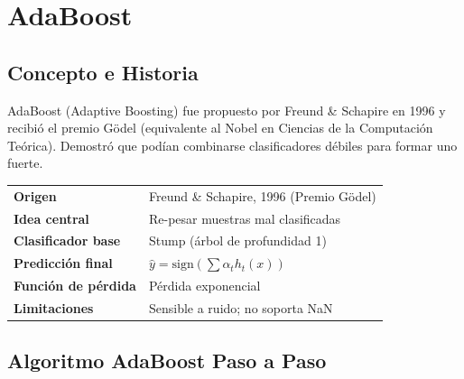 \documentclass[11pt, a4paper]{book}
\begin{document}
\chapter{AdaBoost}

\section{Concepto e Historia}

AdaBoost (Adaptive Boosting) fue propuesto por Freund \& Schapire en 1996 y recibió el premio
Gödel (equivalente al Nobel en Ciencias de la Computación Teórica). Demostró que podían
combinarse clasificadores débiles para formar uno fuerte.

\begin{resumen}
  \begin{tabular}{ll}
    \toprule
    \textbf{Origen} & Freund \& Schapire, 1996 (Premio Gödel)\\
    \textbf{Idea central} & Re-pesar muestras mal clasificadas\\
    \textbf{Clasificador base} & Stump (árbol de profundidad 1)\\
    \textbf{Predicción final} & $\hat{y} = \text{sign}\!\left(\sum \alpha_t h_t(x)\right)$\\
    \textbf{Función de pérdida} & Pérdida exponencial\\
    \textbf{Limitaciones} & Sensible a ruido; no soporta NaN\\
    \bottomrule
  \end{tabular}
\end{resumen}

\section{Algoritmo AdaBoost Paso a Paso}
\end{document}
